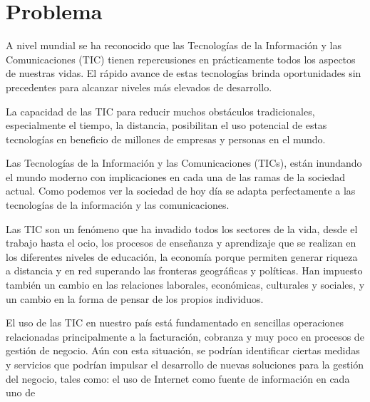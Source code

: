\documentclass[12pt,a4paper]{article}
\newcommand{\espacio}{\par\vspace{3mm}}
\newcommand{\newsection}[1]{\section{\hspace{4mm} #1}}%
\begin{document}
\newpage
\newsection{Problema}
A nivel mundial se ha reconocido que las Tecnologías de la Información y las Comunicaciones (TIC) tienen repercusiones en prácticamente todos los aspectos de nuestras vidas. El rápido avance de estas tecnologías brinda oportunidades sin precedentes para alcanzar niveles más elevados de desarrollo.
\espacio La capacidad de las TIC para reducir muchos obstáculos tradicionales, especialmente el tiempo, la distancia, posibilitan el uso potencial de estas tecnologías en beneficio de millones de empresas y personas en el mundo.
\espacio Las Tecnologías de la Información y las Comunicaciones (TICs), están inundando el mundo moderno con implicaciones en cada una de las ramas de la sociedad actual. Como podemos ver la sociedad de hoy día se adapta perfectamente a las tecnologías de la información y las comunicaciones.
\espacio Las TIC son un fenómeno que ha invadido todos los sectores de la vida, desde el trabajo hasta el ocio, los procesos de enseñanza y aprendizaje que se realizan en los diferentes niveles de educación, la economía porque permiten generar riqueza a distancia y en red superando las fronteras geográficas y políticas. Han impuesto también un cambio en las relaciones laborales, económicas, culturales y sociales, y un cambio en la forma de pensar de los propios individuos.
\espacio El uso de las TIC en nuestro país está fundamentado en sencillas operaciones relacionadas principalmente a la facturación, cobranza y muy poco en procesos de gestión de negocio. Aún con esta situación, se podrían identificar ciertas medidas y servicios que podrían impulsar el desarrollo de nuevas soluciones para la gestión del negocio, tales como: el uso de Internet como fuente de información en cada uno de
\end{document}
